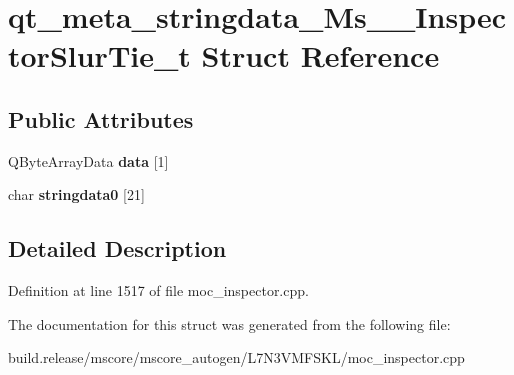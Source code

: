 \hypertarget{structqt__meta__stringdata___ms_____inspector_slur_tie__t}{}\section{qt\+\_\+meta\+\_\+stringdata\+\_\+\+Ms\+\_\+\+\_\+\+Inspector\+Slur\+Tie\+\_\+t Struct Reference}
\label{structqt__meta__stringdata___ms_____inspector_slur_tie__t}
\subsection*{Public Attributes}
\begin{DoxyCompactItemize}
\item 
\mbox{\label{structqt__meta__stringdata___ms_____inspector_slur_tie__t_a1de1a0b1fc43c60ff2a51a5b42a0ce81}} 
Q\+Byte\+Array\+Data {\bfseries data} \mbox{[}1\mbox{]}
\item 
\mbox{\label{structqt__meta__stringdata___ms_____inspector_slur_tie__t_a5d6eeb8c408f6146d189e75c1f0abc68}} 
char {\bfseries stringdata0} \mbox{[}21\mbox{]}
\end{DoxyCompactItemize}


\subsection{Detailed Description}


Definition at line 1517 of file moc\+\_\+inspector.\+cpp.



The documentation for this struct was generated from the following file\+:\begin{DoxyCompactItemize}
\item 
build.\+release/mscore/mscore\+\_\+autogen/\+L7\+N3\+V\+M\+F\+S\+K\+L/moc\+\_\+inspector.\+cpp\end{DoxyCompactItemize}
